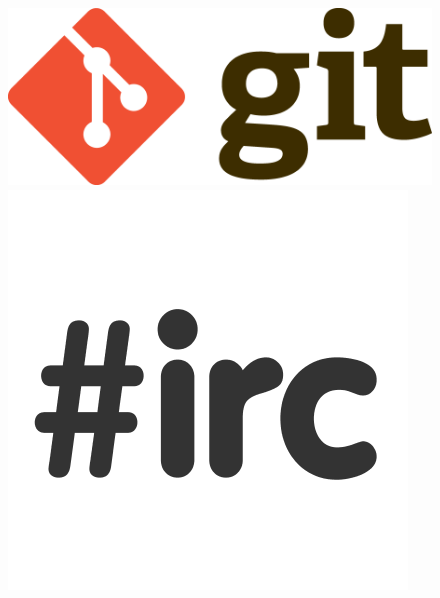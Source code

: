 \documentclass{beamer}
\begin{document}
\begin{frame}
\begin{columns}
\begin{figure}
      \includegraphics[scale=0.03]{images/git-logo.png} \\
      \includegraphics[scale=0.07]{images/irc-logo.png}
    \end{figure}
  \end{columns}



\end{frame}
\end{document}
